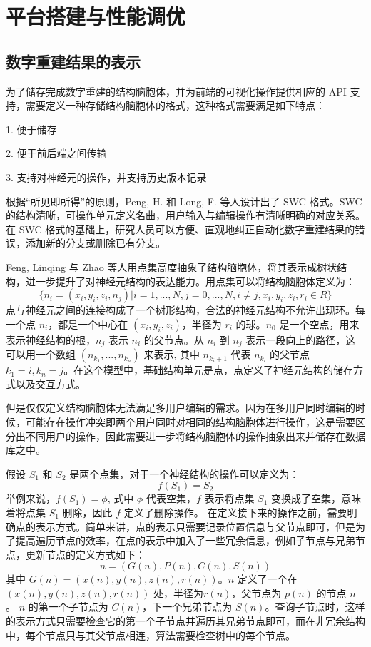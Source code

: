 \chapter{平台搭建与性能调优}
\label{chap3}

\section{数字重建结果的表示}
为了储存完成数字重建的结构脑胞体，并为前端的可视化操作提供相应的 API 支持，需要定义一种存储结构脑胞体的格式，这种格式需要满足如下特点：

1. 便于储存

2. 便于前后端之间传输

3. 支持对神经元的操作，并支持历史版本记录

根据“所见即所得”的原则，Peng, H. 和 Long, F. 等人设计出了 SWC 格式。SWC 的结构清晰，可操作单元定义名曲，用户输入与编辑操作有清晰明确的对应关系。在 SWC 格式的基础上，研究人员可以方便、直观地纠正自动化数字重建结果的错误，添加新的分支或删除已有分支。

Feng, Linqing 与 Zhao 等人用点集高度抽象了结构脑胞体，将其表示成树状结构，进一步提升了对神经元结构的表达能力。用点集可以将结构脑胞体定义为：
$$\{ n_i = (x_i, y_i, z_i, n_j) | i = 1,..., N, j = 0,..., N, i \neq j, x_i, y_i, z_i, r_i \in R \}$$
点与神经元之间的连接构成了一个树形结构，合法的神经元结构不允许出现环。每一个点 $n_i$，都是一个中心在 $(x_i, y_i, z_i)$，半径为 $r_i$ 的球。$n_0$ 是一个空点，用来表示神经结构的根，$n_j$ 表示 $n_i$ 的父节点。从 $n_i$ 到 $n_j$ 表示一段向上的路径，这可以用一个数组 $(n_{k_1},...,n_{k_n})$ 来表示, 其中 $n_{k_i+1}$ 代表 $n_{k_i}$ 的父节点 $k_1 = i, k_n = j$。在这个模型中，基础结构单元是点，点定义了神经元结构的储存方式以及交互方式。

但是仅仅定义结构脑胞体无法满足多用户编辑的需求。因为在多用户同时编辑的时候，可能存在操作冲突即两个用户同时对相同的结构脑胞体进行操作，这是需要区分出不同用户的操作，因此需要进一步将结构脑胞体的操作抽象出来并储存在数据库之中。

假设 $S_1$ 和 $S_2$ 是两个点集，对于一个神经结构的操作可以定义为：
$$f(S_1) = S_2$$
举例来说，$f(S_1)= \phi$, 式中 $\phi$ 代表空集，$f$ 表示将点集 $S_1$ 变换成了空集，意味着将点集 $S_1$ 删除，因此 $f$ 定义了删除操作。
在定义接下来的操作之前，需要明确点的表示方式。简单来讲，点的表示只需要记录位置信息与父节点即可，但是为了提高遍历节点的效率，在点的表示中加入了一些冗余信息，例如子节点与兄弟节点，更新节点的定义方式如下：
$$n=(G(n), P(n), C(n), S(n))$$
其中 $G(n) = (x(n), y(n), z(n), r(n))$。$n$ 定义了一个在$(x(n), y(n), z(n), r(n))$ 处，半径为$r(n)$，父节点为 $p(n)$ 的节点 $n$。 $n$ 的第一个子节点为 $C(n)$，下一个兄弟节点为 $S(n)$。查询子节点时，这样的表示方式只需要检查它的第一个子节点并遍历其兄弟节点即可，而在非冗余结构中，每个节点只与其父节点相连，算法需要检查树中的每个节点。

